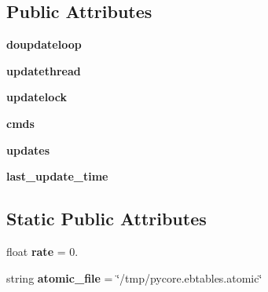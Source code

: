 \subsection*{Public Attributes}
\begin{DoxyCompactItemize}
\item 
\hypertarget{classcore_1_1netns_1_1vnet_1_1_ebtables_queue_a7a502d58221c3cb82cd6c8470defad72}{{\bfseries doupdateloop}}\label{classcore_1_1netns_1_1vnet_1_1_ebtables_queue_a7a502d58221c3cb82cd6c8470defad72}

\item 
\hypertarget{classcore_1_1netns_1_1vnet_1_1_ebtables_queue_a8f353a4d4ca9329122a663aabc77bd21}{{\bfseries updatethread}}\label{classcore_1_1netns_1_1vnet_1_1_ebtables_queue_a8f353a4d4ca9329122a663aabc77bd21}

\item 
\hypertarget{classcore_1_1netns_1_1vnet_1_1_ebtables_queue_a618fb78317ec2580ffcca2a1f6f28ad8}{{\bfseries updatelock}}\label{classcore_1_1netns_1_1vnet_1_1_ebtables_queue_a618fb78317ec2580ffcca2a1f6f28ad8}

\item 
\hypertarget{classcore_1_1netns_1_1vnet_1_1_ebtables_queue_a6484f52f82918d33c06b6a97b858f505}{{\bfseries cmds}}\label{classcore_1_1netns_1_1vnet_1_1_ebtables_queue_a6484f52f82918d33c06b6a97b858f505}

\item 
\hypertarget{classcore_1_1netns_1_1vnet_1_1_ebtables_queue_ae67fde6a6cdadaeea281ac71545c0e27}{{\bfseries updates}}\label{classcore_1_1netns_1_1vnet_1_1_ebtables_queue_ae67fde6a6cdadaeea281ac71545c0e27}

\item 
\hypertarget{classcore_1_1netns_1_1vnet_1_1_ebtables_queue_a7d038756c37b353ee8a177470c65e533}{{\bfseries last\+\_\+update\+\_\+time}}\label{classcore_1_1netns_1_1vnet_1_1_ebtables_queue_a7d038756c37b353ee8a177470c65e533}

\end{DoxyCompactItemize}
\subsection*{Static Public Attributes}
\begin{DoxyCompactItemize}
\item 
\hypertarget{classcore_1_1netns_1_1vnet_1_1_ebtables_queue_aa6c1eae9d60522b22eced0b39572cee6}{float {\bfseries rate} = 0.}\label{classcore_1_1netns_1_1vnet_1_1_ebtables_queue_aa6c1eae9d60522b22eced0b39572cee6}

\item 
\hypertarget{classcore_1_1netns_1_1vnet_1_1_ebtables_queue_a26499d06c4507a984264aa2d775aa3a0}{string {\bfseries atomic\+\_\+file} = \char`\"{}/tmp/pycore.\+ebtables.\+atomic\char`\"{}}\label{classcore_1_1netns_1_1vnet_1_1_ebtables_queue_a26499d06c4507a984264aa2d775aa3a0}

\end{DoxyCompactItemize}


